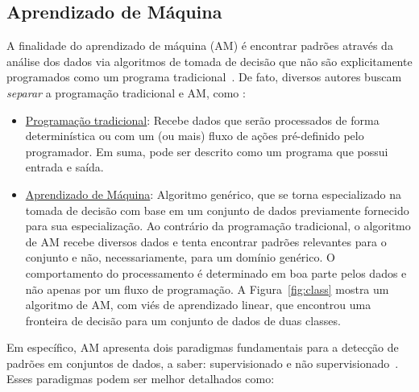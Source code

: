\subsection{Aprendizado de Máquina}

A finalidade do aprendizado de máquina (AM) é encontrar padrões através da análise dos dados via algoritmos de tomada de decisão que não são explicitamente programados como um programa tradicional~\cite{Sullivan2017}.
De fato, diversos autores buscam \textit{separar} a programação tradicional e AM, como :

\begin{itemize}
    \item \underline{Programação tradicional}: Recebe dados que serão processados de forma determinística ou com um (ou mais) fluxo de ações pré-definido pelo programador. 
    Em suma, pode ser descrito como um programa que possui entrada e saída. 
    
    \item \underline{Aprendizado de Máquina}: Algoritmo genérico, que se torna especializado na tomada de decisão com base em um conjunto de dados previamente fornecido para sua especialização.  
    Ao contrário da programação tradicional, o algoritmo de AM recebe diversos dados e tenta encontrar padrões relevantes para o conjunto e não, necessariamente, para um domínio genérico.
    O comportamento do processamento é determinado em boa parte pelos dados e não apenas por um fluxo de programação. 
    A Figura~\ref{fig:class} mostra um algoritmo de AM, com viés de aprendizado linear, que encontrou uma fronteira de decisão para um conjunto de dados de duas classes.

\end{itemize}

Em específico, AM apresenta dois paradigmas fundamentais para a detecção de padrões em conjuntos de dados, a saber: supervisionado e não supervisionado~\cite{Bonaccorso2018}.
Esses paradigmas podem ser melhor detalhados como:

